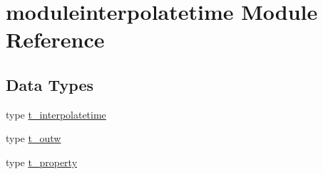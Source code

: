 \hypertarget{namespacemoduleinterpolatetime}{}\section{moduleinterpolatetime Module Reference}
\label{namespacemoduleinterpolatetime}
\subsection*{Data Types}
\begin{DoxyCompactItemize}
\item 
type \mbox{\hyperlink{structmoduleinterpolatetime_1_1t__interpolatetime}{t\+\_\+interpolatetime}}
\item 
type \mbox{\hyperlink{structmoduleinterpolatetime_1_1t__outw}{t\+\_\+outw}}
\item 
type \mbox{\hyperlink{structmoduleinterpolatetime_1_1t__property}{t\+\_\+property}}
\end{DoxyCompactItemize}
